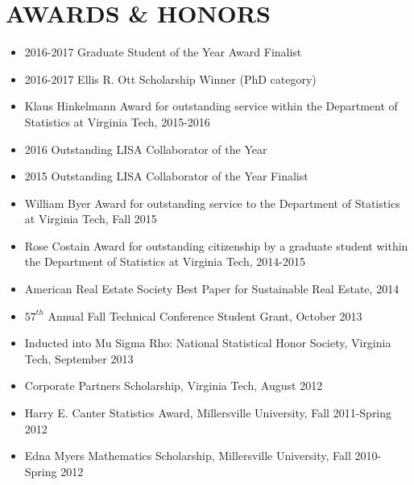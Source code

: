 \documentclass[10pt]{article}
\begin{document}
\section*{AWARDS \& HONORS}
\begin{itemize}
\item 2016-2017 Graduate Student of the Year Award Finalist
\item 2016-2017 Ellis R. Ott Scholarship Winner (PhD category)
\item Klaus Hinkelmann Award for outstanding service within the Department of Statistics at Virginia Tech, 2015-2016
\item 2016 Outstanding LISA Collaborator of the Year
\item 2015 Outstanding LISA Collaborator of the Year Finalist
\item William Byer Award for outstanding service to the Department of Statistics at Virginia Tech, Fall 2015
\item Rose Costain Award for outstanding citizenship by a graduate student within the Department of Statistics at Virginia Tech, 2014-2015
\item American Real Estate Society Best Paper for Sustainable Real Estate, 2014
\item $57^{th}$ Annual Fall Technical Conference Student Grant, October 2013
\item Inducted into Mu Sigma Rho: National Statistical Honor Society, Virginia Tech, September 2013
\item Corporate Partners Scholarship, Virginia Tech, August 2012 
\item Harry E. Canter Statistics Award, Millersville University, Fall 2011-Spring 2012
\item Edna Myers Mathematics Scholarship, Millersville University, Fall 2010-Spring 2012

\end{itemize}
\end{document}
